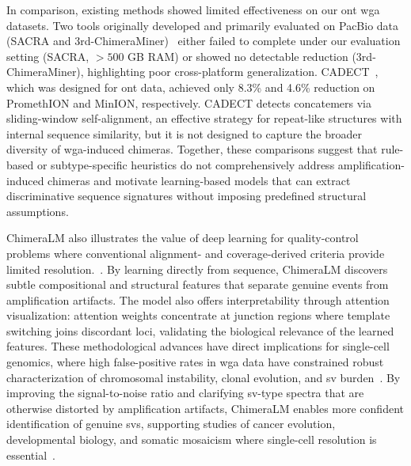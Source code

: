 \documentclass[pdflatex,lineno]{sn-jnl}%
\begin{document}
In comparison, existing methods showed limited effectiveness on our \gls{ont} \gls{wga} datasets.
Two tools originally developed and primarily evaluated on PacBio data (SACRA and 3rd-ChimeraMiner)~\cite{kiguchi2021longread,lu2023exploration} either failed to complete under our evaluation setting (SACRA, $>500$ GB RAM) or showed no detectable reduction (3rd-ChimeraMiner), highlighting poor cross-platform generalization.
CADECT~\cite{agyabeng2025evaluating}, which was designed for \gls{ont} data, achieved only 8.3\% and 4.6\% reduction on PromethION and MinION, respectively.
CADECT detects concatemers via sliding-window self-alignment, an effective strategy for repeat-like structures with internal sequence similarity, but it is not designed to capture the broader diversity of \gls{wga}-induced chimeras.
Together, these comparisons suggest that rule-based or subtype-specific heuristics do not comprehensively address amplification-induced chimeras and motivate learning-based models that can extract discriminative sequence signatures without imposing predefined structural assumptions.

ChimeraLM also illustrates the value of deep learning for quality-control problems where conventional alignment- and coverage-derived criteria provide limited resolution.~\cite{lu2023exploration,kiguchi2021longread,li2024deepchopper, agyabeng2025evaluating}.
By learning directly from sequence, ChimeraLM discovers subtle compositional and structural features that separate genuine events from amplification artifacts.
The model also offers interpretability through attention visualization: attention weights concentrate at junction regions where template switching joins discordant loci, validating the biological relevance of the learned features.
These methodological advances have direct implications for single-cell genomics, where high false-positive rates in \gls{wga} data have constrained robust characterization of chromosomal instability, clonal evolution, and \gls{sv} burden~\cite{kosugi2019comprehensive,mahmoud2019structural,hardLongreadWholegenomeAnalysis2023a}.
By improving the signal-to-noise ratio and clarifying \gls{sv}-type spectra that are otherwise distorted by amplification artifacts, ChimeraLM enables more confident identification of genuine \glspl{sv}, supporting studies of cancer evolution, developmental biology, and somatic mosaicism where single-cell resolution is essential~\cite{hoijerAmplificationfreeLongreadSequencing2020, haComprehensiveBenchmarkingGuidelines2023}.
\end{document}
